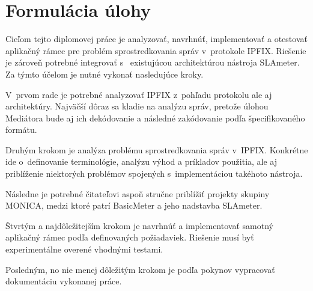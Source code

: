 \section{Formul\'acia \'ulohy}

Cieľom tejto diplomovej práce je analyzovať, navrhnúť, implementovať a otestovať aplikačný rámec 
pre problém sprostredkovania správ v~protokole IPFIX. Riešenie je zároveň potrebné integrovať s~
existujúcou architektúrou nástroja SLAmeter. Za týmto účelom je nutné vykonať nasledujúce kroky. 

V~prvom rade je potrebné analyzovať IPFIX z~pohľadu protokolu ale aj architektúry.
Najväčší dôraz sa kladie na analýzu správ, pretože 
úlohou Mediátora bude aj ich dekódovanie a následné zakódovanie podľa špecifikovaného formátu.

Druhým krokom je analýza problému sprostredkovania správ v~IPFIX. Konkrétne ide o~definovanie terminológie,
analýzu výhod a príkladov použitia, ale aj priblíženie niektorých problémov spojených s~implementáciou 
takéhoto nástroja.

Následne je potrebné čitateľovi aspoň stručne priblížiť projekty skupiny MONICA, medzi ktoré patrí
BasicMeter a jeho nadstavba SLAmeter. 

Štvrtým a najdôležitejším krokom je navrhnúť a implementovať samotný aplikačný rámec podľa definovaných 
požiadaviek. Riešenie musí byť experimentálne overené vhodnými testami.

Posledným, no nie menej dôležitým krokom je podľa pokynov vypracovať dokumentáciu vykonanej práce.

